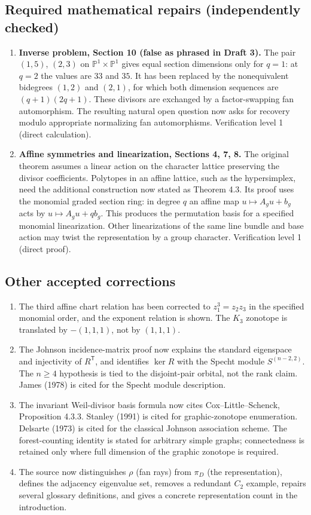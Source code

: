 \documentclass[12pt,letterpaper]{article}
\begin{document}
\subsection*{Required mathematical repairs (independently checked)}
\begin{enumerate}
\item \textbf{Inverse problem, Section 10 (false as phrased in Draft 3).}
The pair $(1,5)$, $(2,3)$ on $\mathbb P^1\times\mathbb P^1$ gives equal
section dimensions only for $q=1$: at $q=2$ the values are $33$ and $35$.
It has been replaced by the nonequivalent bidegrees $(1,2)$ and $(2,1)$,
for which both dimension sequences are $(q+1)(2q+1)$. These divisors
are exchanged by a factor-swapping fan automorphism. The resulting natural
open question now asks for recovery modulo appropriate normalizing
fan automorphisms. Verification level 1 (direct calculation).
\item \textbf{Affine symmetries and linearization, Sections 4, 7, 8.}
The original theorem assumes a linear action on the character lattice
preserving the divisor coefficients. Polytopes in an affine lattice,
such as the hypersimplex, need the additional construction now stated
as Theorem 4.3. Its proof uses the monomial graded section ring:
in degree $q$ an affine map $u\mapsto A_gu+b_g$ acts by
$u\mapsto A_gu+qb_g$. This produces the permutation basis for a
specified monomial linearization. Other linearizations of the same
line bundle and base action may twist the representation by a group
character. Verification level 1 (direct proof).
\end{enumerate}

\subsection*{Other accepted corrections}
\begin{enumerate}
\item The third affine chart relation has been corrected to
$z_1^3=z_2z_3$ in the specified monomial order, and the exponent
relation is shown. The $K_3$ zonotope is translated by
$-(1,1,1)$, not by $(1,1,1)$.
\item The Johnson incidence-matrix proof now explains the standard
eigenspace and injectivity of $R^{\mathsf T}$, and identifies
$\ker R$ with the Specht module $S^{(n-2,2)}$. The $n\geq4$
hypothesis is tied to the disjoint-pair orbital, not the rank claim.
James (1978) is cited for the Specht module description.
\item The invariant Weil-divisor basis formula now cites
Cox--Little--Schenck, Proposition 4.3.3.
Stanley (1991) is cited for graphic-zonotope enumeration.
Delsarte (1973) is cited for the classical Johnson association scheme.
The forest-counting identity is stated for arbitrary simple graphs;
connectedness is retained only where full dimension of the graphic
zonotope is required.
\item The source now distinguishes $\rho$ (fan rays) from $\pi_D$
(the representation), defines the adjacency eigenvalue set,
removes a redundant $C_2$ example, repairs several glossary
definitions, and gives a concrete representation count in the introduction.
\end{enumerate}
\end{document}
